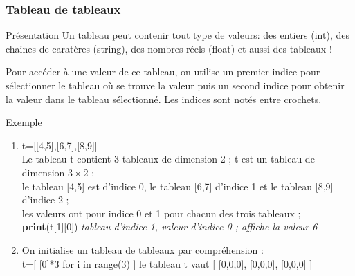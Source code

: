 \documentclass[9pt]{beamer}
\newcounter{num}
\begin{document}
\begin{frame}
\frametitle{Tableau de tableaux}

\begin{block}{Présentation}
Un tableau peut contenir tout type de valeurs: des entiers (int), des chaines de caratères (string), des nombres réels (float) et aussi des tableaux !\medskip

Pour accéder à une valeur de ce tableau, on utilise un premier indice pour sélectionner le tableau où se trouve la valeur puis un second indice pour obtenir la valeur dans le tableau sélectionné. Les indices sont notés entre crochets.
\end{block}

\begin{exampleblock}{Exemple}
\begin{enumerate}
\item t=[[4,5],[6,7],[8,9]]\\
Le tableau t contient 3 tableaux de dimension 2 ; t est un tableau de dimension $3 \times 2$ ;\\
le tableau [4,5] est d'indice 0, le tableau [6,7] d'indice 1 et le tableau [8,9] d'indice 2 ;\\
les valeurs ont pour indice 0 et 1 pour chacun des trois tableaux ;\\

\textbf{print}(t[1][0]) \hspace{1cm} \textit{tableau d'indice 1, valeur d'indice 0 ; affiche la valeur 6}
\item On initialise un tableau de tableaux par compréhension :\\
t=[ [0]*3 for i in range(3) ] \hspace{1cm} le tableau t vaut [ [0,0,0], [0,0,0], [0,0,0] ]
\end{enumerate}

\end{exampleblock}

\end{frame}
\end{document}
